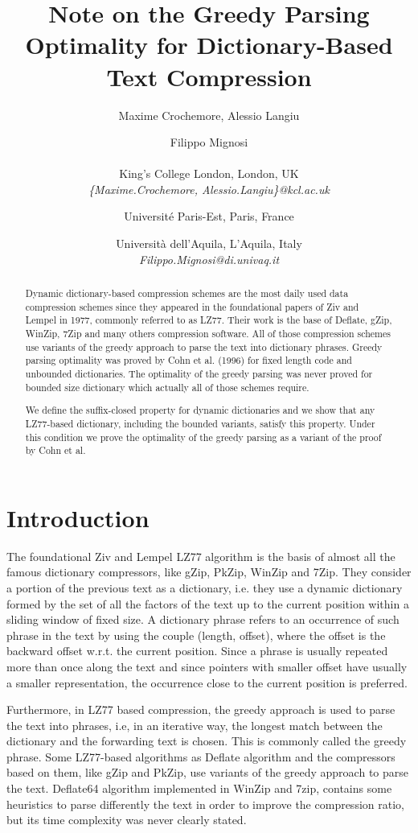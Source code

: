 \documentclass[12pt]{article}
\title{\Large{\textbf{Note on the Greedy Parsing Optimality for Dictionary-Based Text Compression}}}
\author{
Maxime Crochemore,
Alessio Langiu \and
Filippo Mignosi
\\
\\
 King's College London, London, UK \\
\textit{\{Maxime.Crochemore, Alessio.Langiu\}@kcl.ac.uk} \and
 Universit\'e Paris-Est, Paris, France \and
 Universit\`a dell'Aquila, L'Aquila, Italy \\
\textit{Filippo.Mignosi@di.univaq.it} 
}
\theoremstyle{plain}
\theoremstyle{definition}
\theoremstyle{remark}
\begin{document}
\maketitle



\begin{abstract}
Dynamic dictionary-based compression schemes are the most daily used data compression schemes since they appeared in the foundational papers of Ziv and Lempel in 1977, commonly referred to as LZ77.
Their work is the base of Deflate, gZip, WinZip, 7Zip and many others compression software. 
All of those compression schemes use variants of the greedy approach to parse the text into dictionary phrases.
Greedy parsing optimality was proved by Cohn et al. (1996) for fixed length code and unbounded dictionaries.
The optimality of the greedy parsing was never proved for bounded size dictionary which actually all of those schemes require.


We define the suffix-closed property for dynamic dictionaries and we 
show that any LZ77-based dictionary, including the bounded variants, 
satisfy this property. Under this condition we prove the optimality of the greedy parsing as a variant of the proof by Cohn et al.
\end{abstract}


\section*{Introduction}\label{sec:intro}

The foundational Ziv and Lempel LZ77 algorithm \cite{lz77} is the basis of almost all the famous dictionary compressors, like gZip, PkZip, WinZip and 7Zip.
They consider a portion of the previous text as a dictionary, i.e. they use a dynamic dictionary formed by the set of all the factors of the text up to the current position within a sliding window of fixed size.
A dictionary phrase refers to an occurrence of such phrase in the text by using the couple (length, offset), where the offset is the backward offset w.r.t. the current position. Since a phrase is usually repeated more than once along the text and since pointers with smaller offset have usually a smaller representation, the occurrence close to the current position is preferred.

Furthermore, in LZ77 based compression, the greedy approach is used to parse the text into phrases, i.e, in an iterative way, the longest match between the dictionary and the forwarding text is chosen.
This is commonly called the greedy phrase.
Some LZ77-based algorithms as Deflate algorithm and the compressors based on them, like gZip and PkZip, use variants of the greedy approach to parse the text. 
Deflate64 algorithm implemented in WinZip and 7zip, contains some heuristics to parse differently the text in order to improve the compression ratio, but its time complexity was never clearly stated. 
\end{document}
